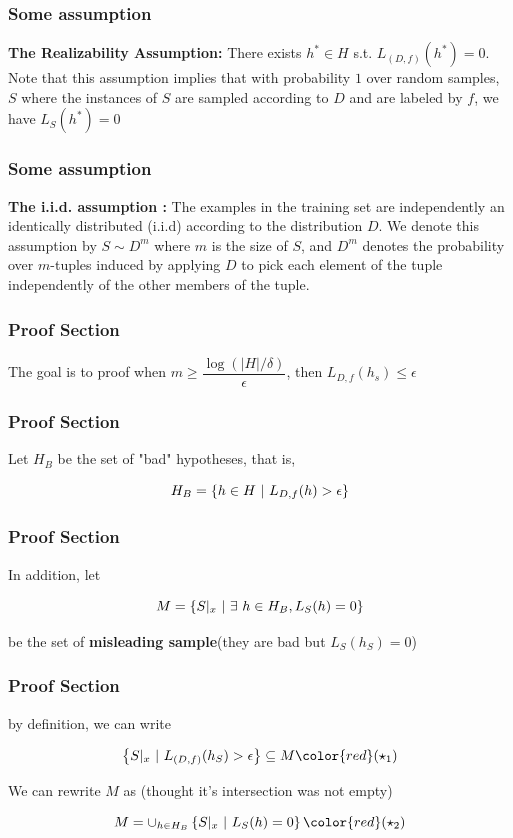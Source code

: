 \begin{frame}
	\frametitle{Some assumption}
	\textbf{The Realizability Assumption:} There exists $h^* \in H$ s.t. $L_{(D,f)}(h^*) = 0$. Note that this assumption implies that with probability $1$ over random samples, $S$ where the instances of $S$ are sampled according to $D$ and are labeled by $f$, we have $L_S(h^*) = 0$

	
\end{frame}


\begin{frame}
	\frametitle{Some assumption}
	\textbf{The i.i.d. assumption :} The examples in the training set are independently an identically distributed (i.i.d) according to the distribution $D$. We denote this assumption by $S \sim D^m$ where $m$ is the size of $S$, and $D^m$ denotes the probability over $m$-tuples induced by applying $D$ to pick each element of the tuple independently of the other members of the tuple.
	
\end{frame}


\begin{frame}
	\frametitle{Proof Section}
	The goal is to proof when $m \geq \dfrac{\log(|H|/\delta)}{\epsilon}$, then $L_{D,f}(h_s) \leq \epsilon$
	
\end{frame}

\begin{frame}
	\frametitle{Proof Section}
	Let $H_B$ be the set of "bad" hypotheses, that is,

$$H_B = \left\{h \in H~|~L_{D,f}(h)>\epsilon \right\}$$
	
\end{frame}


\begin{frame}
	\frametitle{Proof Section}
	In addition, let

$$M = \left\{S|_x ~|~ \exists~h \in H_B,L_S(h) = 0 \right\}$$

be the set of \textbf{misleading sample}(they are bad but $L_S(h_S) = 0$)
	
\end{frame}


\begin{frame}
	\frametitle{Proof Section}
	by definition, we can write 

$$\sett{S|_x ~|~ L_{(D,f)}(h_S) > \epsilon} \subseteq M\color{red}(\star_1) $$


We can rewrite $M$ as (thought it's intersection was not empty)

$$M = \cup_{h \in H_B}\sett{S|_x ~|~ L_S(h) = 0}\color{red}(\star_2)$$
	
\end{frame}


